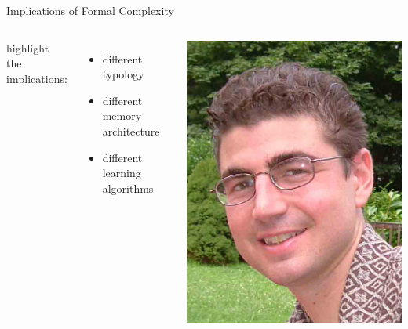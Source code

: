 \documentclass[xcolor={usenames,svgnames,x11names,table}]{beamer}
\begin{document}
\begin{frame}{Implications of Formal Complexity}
    \begin{columns}
        \citet{HeinzIdsardi11, HeinzIdsardi13} highlight\\
        the implications:
        \begin{itemize}
            \item different typology\\
            \item different memory architecture\\
            \item different learning algorithms\\
        \end{itemize}

        \centering
        \scriptsize
        \includegraphics[width=1\linewidth]{./img/heinz_crop}\\


\end{columns}
\end{frame}
\end{document}
